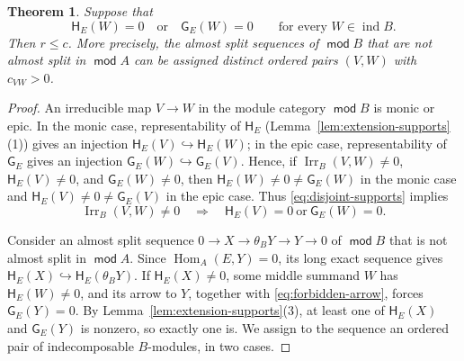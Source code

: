 \documentclass[a4paper,reqno,10pt]{amsart}
\newtheorem{theorem}{Theorem}[section]
\theoremstyle{definition}
\numberwithin{equation}{section}
\DeclareMathOperator{\moduleCategory}{\mathsf{mod}}
\renewcommand{\mod}{\moduleCategory}
\DeclareMathOperator{\ind}{ind}
\DeclareMathOperator{\Hom}{Hom}
\DeclareMathOperator{\Irr}{Irr}
\begin{document}
\begin{theorem}\label{prop:compensation}
Suppose that
\begin{equation}\label{eq:disjoint-supports}
 \mathsf H_E(W)=0\quad\text{or}\quad \mathsf G_E(W)=0
 \qquad\text{for every }W\in\ind B.
\end{equation}
Then \(r\leq c\). More precisely, the almost split sequences of
\(\mod B\) that are not almost split in \(\mod A\) can be assigned distinct
ordered pairs \((V,W)\) with \(c_{VW}>0\).
\end{theorem}
\begin{proof}
An irreducible map \(V\to W\) in the module category \(\mod B\) is
monic or epic. In the monic case, representability of \(\mathsf H_E\)
(Lemma~\ref{lem:extension-supports}(1)) gives an
injection \(\mathsf H_E(V)\hookrightarrow \mathsf H_E(W)\); in the epic case,
representability of \(\mathsf G_E\) gives an injection \(\mathsf G_E(W)\hookrightarrow \mathsf G_E(V)\).
Hence, if \(\Irr_B(V,W)\ne0\), \(\mathsf H_E(V)\ne0\), and
\(\mathsf G_E(W)\ne0\), then \(\mathsf H_E(W)\ne0\ne\mathsf G_E(W)\) in the
monic case and \(\mathsf H_E(V)\ne0\ne\mathsf G_E(V)\) in the epic case.
Thus \eqref{eq:disjoint-supports} implies
\begin{equation}\label{eq:forbidden-arrow}
 \Irr_B(V,W)\ne0\quad\Longrightarrow\quad
 \mathsf H_E(V)=0\ \text{or}\ \mathsf G_E(W)=0.
\end{equation}

Consider an almost split sequence \(0\to X\to\theta_B Y\to Y\to0\) of
\(\mod B\) that is not almost split in \(\mod A\).
Since \(\Hom_A(E,Y)=0\), its long exact sequence gives
\(\mathsf H_E(X)\hookrightarrow \mathsf H_E(\theta_B Y)\). If \(\mathsf H_E(X)\ne0\), some middle summand
\(W\) has \(\mathsf H_E(W)\ne0\), and its arrow to \(Y\), together with
\eqref{eq:forbidden-arrow}, forces \(\mathsf G_E(Y)=0\).
By Lemma~\ref{lem:extension-supports}(3), at least one of \(\mathsf H_E(X)\)
and \(\mathsf G_E(Y)\) is nonzero, so exactly one is. We assign to the
sequence an ordered pair of indecomposable \(B\)-modules, in two cases.


\end{proof}
\end{document}
